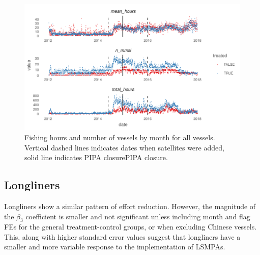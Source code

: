 \documentclass[11pt,english]{article}
\begin{document}
\begin{figure}
	\centering
	\includegraphics{Manuscript_files/figure-latex/unnamed-chunk-7-1.pdf}
	\caption{\label{fig:unnamed-chunk-7}\label{fig:all_panels}Fishing hours and
		number of vessels by month for all vessels. Vertical dashed lines
		indicates dates when satellites were added, solid line indicates PIPA
		closurePIPA closure.}
\end{figure}

\clearpage

\hypertarget{longliners}{%
\subsection{Longliners}\label{longliners}}

Longliners show a similar pattern of effort reduction. However, the
magnitude of the \(\beta_3\) coefficient is smaller  and not significant unless
including month and flag FEs for the general treatment-control groups,
or when excluding Chinese vessels. This, along with higher standard
error values suggest that longliners have a smaller and more variable
response to the implementation of LSMPAs.
\end{document}

